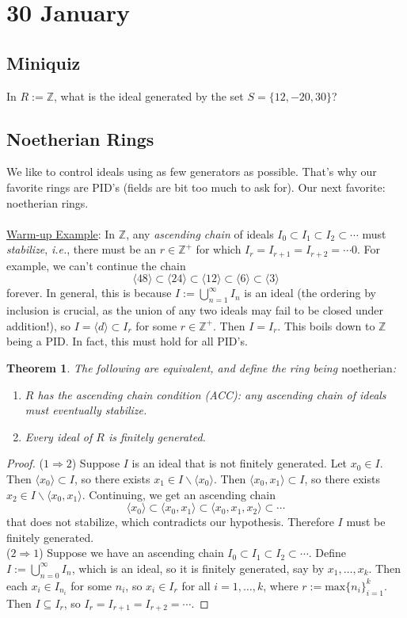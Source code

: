 \documentclass[12pt]{article}
\newcommand{\z}{\mathbb{Z}}
\newcommand{\ita}[1]{\textit{#1}}
\newcommand{\vbrack}[1]{\langle #1\rangle}
\newtheorem{theorem}{Theorem}[section]
\theoremstyle{definition}
\begin{document}
\section{30 January}
\subsection{Miniquiz}
In $R:=\z$, what is the ideal generated by the set $S=\{12,-20,30\}$?
\subsection{Noetherian Rings}
We like to control ideals using as few generators as possible. That's why our favorite rings are PID's (fields are bit too much to ask for). Our next favorite: noetherian rings.\\\\
\underline{Warm-up Example}: In $\z$, any \ita{ascending chain} of ideals $I_0\subset I_1\subset I_2\subset\dotsb$ must \ita{stabilize}, \ita{i.e.}, there must be an $r\in\z^+$ for which $I_r=I_{r+1}=I_{r+2}=\dotsb0$. For example, we can't continue the chain
\begin{equation*}
    \vbrack{48}\subset\vbrack{24}\subset\vbrack{12}\subset\vbrack{6}\subset\vbrack{3}
\end{equation*}
forever. In general, this is because $I:=\bigcup\limits_{n=1}^{\infty}I_n$ is an ideal (the ordering by inclusion is crucial, as the union of any two ideals may fail to be closed under addition!), so $I=\vbrack{d}\subset I_r$ for some $r\in\z^+$. Then $I=I_r$. This boils down to $\z$ being a PID. In fact, this must hold for all PID's.
\begin{theorem}
The following are equivalent, and define the ring being $\mathrm{noetherian}$:
\begin{enumerate}
    \item $R$ has the ascending chain condition (ACC): any ascending chain of ideals must eventually stabilize.
    \item Every ideal of $R$ is finitely generated.
\end{enumerate}
\end{theorem}
\begin{proof}
    ($1\Rightarrow2$) Suppose $I$ is an ideal that is not finitely generated. Let $x_0\in I$. Then $\vbrack{x_0}\subset I$, so there exists $x_1\in I\backslash\vbrack{x_0}$. Then $\vbrack{x_0,x_1}\subset I$, so there exists $x_2\in I\backslash\vbrack{x_0,x_1}$. Continuing, we get an ascending chain
    \begin{equation*}
        \vbrack{x_0}\subset\vbrack{x_0,x_1}\subset\vbrack{x_0,x_1,x_2}\subset\dotsb
    \end{equation*}
    that does not stabilize, which contradicts our hypothesis. Therefore $I$ must be finitely generated.\\
    ($2\Rightarrow1$) Suppose we have an ascending chain $I_0\subset I_1\subset I_2\subset\dotsb$. Define $I:=\bigcup\limits_{n=0}^{\infty}I_n$, which is an ideal, so it is finitely generated, say by $x_1,\dotsc,x_k$. Then each $x_i\in I_{n_i}$ for some $n_i$, so $x_i\in I_r$ for all $i=1,\dotsc,k$, where $r:=\text{max}\{n_i\}_{i=1}^k$. Then $I\subseteq I_r$, so $I_r=I_{r+1}=I_{r+2}=\dotsb$.
\end{proof}
\end{document}
